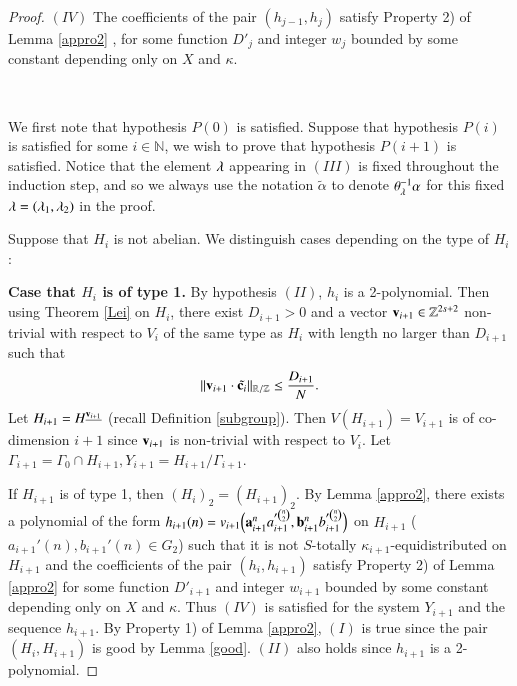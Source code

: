 \documentclass[12pt,amstex]{amsart}
\theoremstyle{definition}
\def \A {\alpha}
\def \D {\kappa}
\def \c {\bold{c}}
\def \a {\bold{a}}
\def \b {\bold{b}}
\def \v {\bold{v}}
\def \l {\bold{\lambda}}
\begin{document}
\begin{proof}
$(IV)$ The coefficients of the pair $(h_{j-1},h_{j})$ satisfy Property 2) of Lemma \ref{appro2} , for some function $D'_{j}$ and integer $w_{j}$ bounded by
some constant depending only on $X$ and $\D$.

\

We first note that hypothesis $P(0)$ is satisfied. Suppose that hypothesis $P(i)$ is satisfied for some $i\in\mathbb{N}$, we wish to prove that hypothesis $P(i+1)$ is satisfied. Notice that the element $\l$ appearing in $(III)$ is fixed throughout the induction step,
and so we always use the notation $\tilde{\A}$ to denote $\theta^{-1}_{\l}\A$ for this fixed $\l=(\lambda_{1},\lambda_{2})$ in the proof.

Suppose that $H_{i}$ is not abelian. We distinguish cases depending on the type of $H_{i}$:

\textbf{Case that $H_{i}$ is of type 1.} By hypothesis $(II)$, $h_{i}$ is a 2-polynomial. Then
using Theorem \ref{Lei} on $H_{i}$,
there exist $D_{i+1}>0$ and a vector $\v_{i+1}\in\mathbb{Z}^{2s+2}$ non-trivial with respect to $V_{i}$ of the same type as $H_{i}$ with length no larger than $D_{i+1}$ such that
\begin{equation}\nonumber
    \begin{split}
     \Vert \v_{i+1}\cdot\tilde{\c_{i}}\Vert_{\mathbb{R}/\mathbb{Z}}\leq\frac{D_{i+1}}{N}.
    \end{split}
  \end{equation}
  Let $H_{i+1}=H^{\underline{\v_{i+1}}}$ (recall Definition \ref{subgroup}). Then $V(H_{i+1})=V_{i+1}$ is of co-dimension $i+1$ since $\v_{i+1}$ is non-trivial with respect to $V_{i}$. Let
 $\Gamma_{i+1}=\Gamma_{0}\cap H_{i+1}, Y_{i+1}=H_{i+1}/\Gamma_{i+1}$.

 If $H_{i+1}$ is of type 1, then $(H_{i})_{2}=(H_{i+1})_{2}$. By Lemma \ref{appro2}, there exists
 a polynomial of the form $h_{i+1}(n)=v_{i+1}\Bigl(\a_{i+1}^{n}a_{i+1}'^{\binom{n}{2}},\b_{i+1}^{n}b_{i+1}'^{\binom{n}{2}}\Bigr)$
on $H_{i+1}$ ($a_{i+1}'(n),b_{i+1}'(n)\in G_{2}$) such that it is not $S$-totally $\D_{i+1}$-equidistributed on $H_{i+1}$ and the coefficients of the pair
$(h_{i},h_{i+1})$ satisfy Property 2) of Lemma \ref{appro2}
for some function $D'_{i+1}$ and integer $w_{i+1}$ bounded by some constant depending only on $X$ and $\D$. Thus $(IV)$ is
satisfied for the system $Y_{i+1}$ and the sequence $h_{i+1}$. By Property 1) of Lemma \ref{appro2}, $(I)$ is true since the pair $(H_{i},H_{i+1})$ is good by
 Lemma \ref{good}. $(II)$ also holds since $h_{i+1}$ is a 2-polynomial.


\end{proof}
\end{document}
